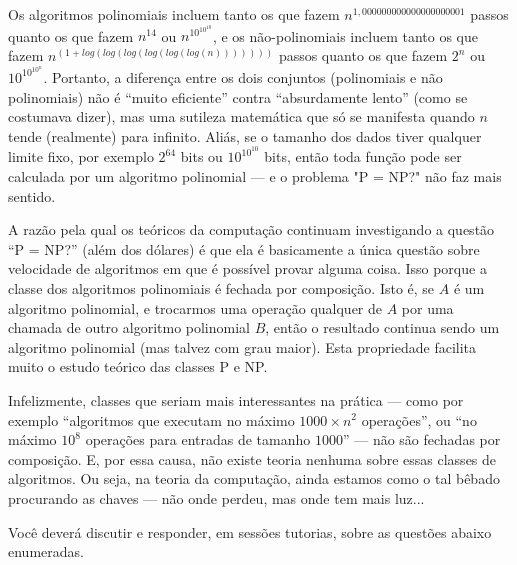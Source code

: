 Os algoritmos polinomiais incluem tanto os que fazem
$n^{1,000000000000000000001}$ passos quanto os que fazem $n^{14}$ 
ou $n^{10^{10^{10}}}$, e os não-polinomiais incluem tanto os que fazem 
$n^{(1+log(log(log(log(log(log(n)))))))}$ passos quanto os que fazem $2^{n}$
ou $10^{10^{10^{n}}}$. 
Portanto, a diferença entre os dois conjuntos (polinomiais e não
polinomiais) não é ``muito eficiente'' contra ``absurdamente lento'' (como
se costumava dizer), mas uma sutileza matemática que só se manifesta
quando $n$ tende (realmente) para infinito.
Aliás, se o tamanho dos dados tiver qualquer limite fixo, por exemplo
$2^{64}$ bits ou $10^{10^{10}}$ bits, então toda função pode ser calculada por um algoritmo
polinomial --- e o problema "P = NP?" não faz mais sentido.

A razão pela qual os teóricos da computação continuam investigando a
questão ``P = NP?'' (além dos dólares) é que ela é basicamente a
única questão sobre velocidade de algoritmos em que é possível provar
alguma coisa. Isso porque a classe dos algoritmos polinomiais é
fechada por composição. Isto é, se $A$ é um algoritmo polinomial, e
trocarmos uma operação qualquer de $A$ por uma chamada de outro
algoritmo polinomial $B$, então o resultado continua sendo um algoritmo
polinomial (mas talvez com grau maior).
Esta propriedade facilita muito o estudo teórico das classes P e NP.

Infelizmente, classes que seriam mais interessantes na prática ---
como por exemplo ``algoritmos que executam no máximo $1000 \times n^{2}$
operações'', ou ``no máximo $10^{8}$ operações para entradas de tamanho
$1000$'' --- não são fechadas por composição. E, por essa causa, não
existe teoria nenhuma sobre essas classes de algoritmos.
Ou seja, na teoria da computação, ainda estamos como o tal bêbado
procurando as chaves --- não onde perdeu, mas onde tem mais luz...

Você deverá discutir e responder, em sessões tutorias,
sobre as questões abaixo enumeradas.


